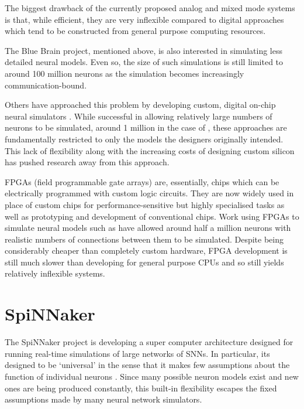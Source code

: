 			The biggest drawback of the currently proposed analog and mixed mode
			systems is that, while efficient, they are very inflexible compared to
			digital approaches which tend to be constructed from general purpose
			computing resources.
			
			The Blue Brain project, mentioned above, is also interested in simulating
			less detailed neural models. Even so, the size of such simulations is
			still limited to around 100 million neurons \cite{markram06} as the
			simulation becomes increasingly communication-bound.
			
			Others have approached this problem by developing custom, digital on-chip
			neural simulators \cite{prange93,jahnke96,schoenauer99,mehrtash03}. While
			successful in allowing relatively large numbers of neurons to be
			simulated, around 1 million in the case of \cite{mehrtash03}, these
			approaches are fundamentally restricted to only the models the designers
			originally intended. This lack of flexibility along with the increasing
			costs of designing custom silicon has pushed research away from this
			approach.
			
			FPGAs (field programmable gate arrays) are, essentially, chips which can
			be electrically programmed with custom logic circuits. They are now widely
			used in place of custom chips for performance-sensitive but highly
			specialised tasks as well as prototyping and development of conventional
			chips. Work using FPGAs to simulate neural models such as
			\cite{hellmich05} have allowed around half a million neurons with
			realistic numbers of connections between them to be simulated. Despite
			being considerably cheaper than completely custom hardware, FPGA
			development is still much slower than developing for general purpose CPUs
			and so still yields relatively inflexible systems.
	
	
	\section{SpiNNaker}
		
		\label{sec:spinnaker}
		
		
		The SpiNNaker project is developing a super computer architecture designed
		for running real-time simulations of large networks of SNNs. In particular,
		its designed to be `universal' in the sense that it makes few assumptions
		about the function of individual neurons \cite{furber06}. Since many
		possible neuron models exist and new ones are being produced constantly,
		this built-in flexibility escapes the fixed assumptions made by many neural
		network simulators\cite{furber07}.
		

